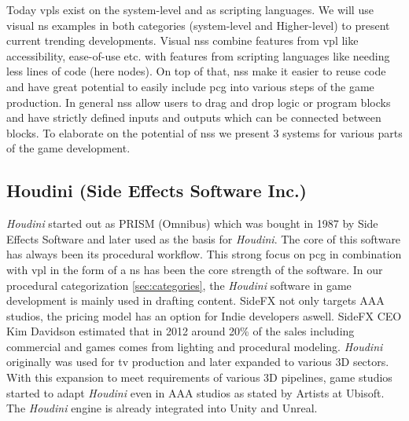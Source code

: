 \documentclass[10pt,a4paper]{article}
\begin{document}
\begin{multicols}{2}
Today \gls{vpl}s exist on the system-level and as scripting languages. We will use visual \gls{ns} examples in both categories (system-level and Higher-level) to present current trending developments. Visual \gls{ns}s combine features from \gls{vpl} like accessibility, ease-of-use etc. with features from scripting languages like needing less lines of code (here nodes). On top of that, \gls{ns}s make it easier to reuse code and have great potential to easily include \gls{pcg} into various steps of the game production. In general \gls{ns}s allow users to drag and drop logic or program blocks and have strictly defined inputs and outputs which can be connected between blocks. To elaborate on the potential of \gls{ns}s we present 3 systems for various parts of the game development. 
\subsection{Houdini (Side Effects Software Inc.)}
\textit{Houdini} started out as PRISM (Omnibus) which was bought in 1987 by Side Effects Software and later used as the basis for \textit{Houdini}. The core of this software has always been its procedural workflow. This strong focus on \gls{pcg} in combination with \gls{vpl} in the form of a \gls{ns} has been the core strength of the software\cite{Seymour2012}. In our procedural categorization \autoref{sec:categories}, the \textit{Houdini} software in game development is mainly used in drafting content. SideFX not only targets AAA studios, the pricing model has an option for Indie developers aswell. SideFX CEO Kim Davidson estimated that in 2012 around 20\% of the sales including commercial and games comes from lighting and procedural modeling. \textit{Houdini} originally was used for tv production and later expanded to various 3D sectors. With this expansion to meet requirements of various 3D pipelines, game studios started to adapt \textit{Houdini} even in AAA studios as stated by Artists at Ubisoft\cite{Carrier2018}. The \textit{Houdini} engine is already integrated into Unity and Unreal\cite{SideFXGamesupport}.

\end{multicols}
\end{document}
